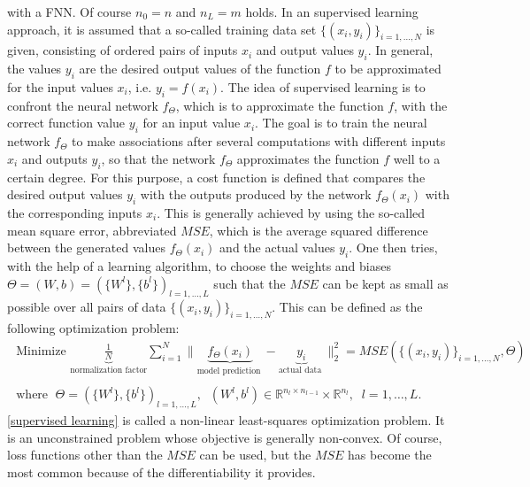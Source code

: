 with a FNN. Of course $n_0 = n$ and $n_L = m$ holds. In an supervised learning approach, it is assumed that a so-called training data set $\{ (x_i, y_i) \}_{i = 1, \ldots, N}$ is given, consisting of ordered pairs of inputs $x_i$ and output values $y_i$. In general, the values $y_i$ are the desired output values of the function $f$ to be approximated for the input values $x_i$, i.e. $y_i = f(x_i)$. The idea of supervised learning is to confront the neural network $f_{\Theta}$, which is to approximate the function $f$, with the correct function value $y_i$ for an input value $x_i$. The goal is to train the neural network $f_{\Theta}$ to make associations after several computations with different inputs $x_i$ and outputs $y_i$, so that the network $f_{\Theta}$ approximates the function $f$ well to a certain degree. For this purpose, a cost function is defined that compares the desired output values $y_i$ with the outputs produced by the network $f_{\Theta}(x_i)$ with the corresponding inputs $x_i$. This is generally achieved by using the so-called mean square error, abbreviated $MSE$, which is the average squared difference between the generated values $f_{\Theta}(x_i)$ and the actual values $y_i$. One then tries, with the help of a learning algorithm, to choose the weights and biases $\Theta = (W, b) = (\{ W^l \}, \{ b^l \})_{l = 1, \ldots, L}$ such that the $MSE$ can be kept as small as possible over all pairs of data $\{ (x_i, y_i) \}_{i = 1, \ldots, N}$. This can be defined as the following optimization problem:
\begin{equation}
    \label{supervised learning}
    \begin{gathered}
        \text{ Minimize } \underbrace{\frac{1}{N}}_{\text{normalization factor}} \sum_{i=1}^{N} \lVert \underbrace{ f_{\Theta} \left(x_{i}\right)}_{\text{model prediction }} - \underbrace{y_{i}}_{\text{actual data }} \rVert^{2}_2 =  MSE(\{ (x_i, y_i) \}_{i = 1, \ldots, N}, \Theta) \\
        \\
        \text{ where } \; \Theta = (\{ W^l \}, \{ b^l \})_{l = 1, \ldots, L}, \; \; \left(W^{l}, b^{l}\right) \in \mathbb{R}^{n_l \times n_{l-1}} \times \mathbb{R}^{n_l}, \; \; l=1, \ldots, L .
    \end{gathered}
\end{equation}
\cref{supervised learning} is called a non-linear least-squares optimization problem. It is an unconstrained problem whose objective is generally non-convex. Of course, loss functions other than the $MSE$ can be used, but the $MSE$ has become the most common because of the differentiability it provides. \\
